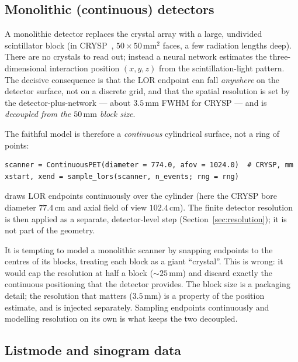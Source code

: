 \subsection{Monolithic (continuous) detectors}
\label{sec:geometry:continuous}

A monolithic detector replaces the crystal array with a large, undivided
scintillator block (in CRYSP~\cite{crysp2026}, $50\times50\,\mathrm{mm}^2$
faces, a few radiation lengths deep). There are no crystals to read out; instead
a neural network estimates the three-dimensional interaction position
$(x,y,z)$ from the scintillation-light pattern. The decisive consequence is
that the LOR endpoint can fall \emph{anywhere} on the detector surface, not on a
discrete grid, and that the spatial resolution is set by the
detector-plus-network --- about $3.5\,\mathrm{mm}$ FWHM for CRYSP --- and is
\emph{decoupled from the $50\,\mathrm{mm}$ block size}.

The faithful model is therefore a \emph{continuous} cylindrical surface, not a
ring of points:
\begin{lstlisting}
scanner = ContinuousPET(diameter = 774.0, afov = 1024.0)  # CRYSP, mm
xstart, xend = sample_lors(scanner, n_events; rng = rng)
\end{lstlisting}
 draws LOR endpoints continuously over the cylinder
(here the CRYSP bore diameter $77.4\,\mathrm{cm}$ and axial field of view
$102.4\,\mathrm{cm}$). The finite detector resolution is then applied as a
separate, detector-level step (Section~\ref{sec:resolution}); it is not part of
the geometry.

\begin{remark}
It is tempting to model a monolithic scanner by snapping endpoints to the
centres of its blocks, treating each block as a giant ``crystal''. This is
wrong: it would cap the resolution at half a block ($\sim25\,\mathrm{mm}$) and
discard exactly the continuous positioning that the detector provides. The
block size is a packaging detail; the resolution that matters
($3.5\,\mathrm{mm}$) is a property of the position estimate, and is injected
separately. Sampling endpoints continuously and modelling resolution on its own
is what keeps the two decoupled.
\end{remark}

\subsection{Listmode and sinogram data}
\label{sec:geometry:data}

